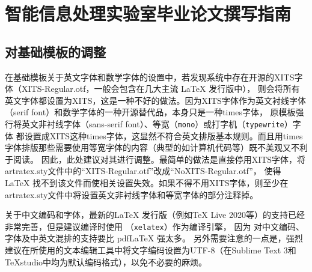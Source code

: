 
\newcommand*{\ltxcmdname}[1]{\texttt{\textbackslash #1}}
\newcommand*{\ltxenvname}[1]{\texttt{#1}}
\newcommand*{\dif}{\mathop{}\!\mathrm{d}}
\newcommand*{\tc}[1]{\multicolumn{1}{c|}{#1}} %

\newcommand*{\figref}[1]{图~\ref{#1}~}
\newcommand*{\secref}[1]{~\ref{#1}~节}
\newcommand*{\tabref}[1]{表~\ref{#1}~}
\newcommand*{\algoref}[1]{算法~\ref{#1}~}
\newcommand*{\codref}[1]{程序~\ref{#1}~}
\newcommand*{\thmref}[1]{定理~\ref{#1}~}
\newcommand*{\axmref}[1]{公理~\ref{#1}~}
\newcommand*{\lemref}[1]{引理~\ref{#1}~}
\newcommand*{\prpref}[1]{命题~\ref{#1}~}
\newcommand*{\defref}[1]{定义~\ref{#1}~}

\newcommand*{\ntcite}[1]{~\cite{#1}~}
\newcommand*{\npcite}[1]{\textsuperscript{\cite{#1}}}

\chapter{智能信息处理实验室毕业论文撰写指南}

\section{对基础模板的调整}

在基础模板关于英文字体和数学字体的设置中，若发现系统中存在开源的XITS字体（XITS-Regular.otf，一般会包含在几大主流 \LaTeX{} 发行版中），
则会将所有英文字体都设置为XITS，这是一种不好的做法。因为XITS字体作为英文衬线字体（serif font）和数学字体的一种开源替代品，本身只是一种times字体，
原模板强行将英文非衬线字体（\textsf{sans-serif font}）、等宽（\texttt{mono}）或打字机（\texttt{typewrite}）字体
都设置成XITS这种times字体，这显然不符合英文排版基本规则。而且用times字体排版那些需要使用等宽字体的内容（典型的如计算机代码等）既不美观又不利于阅读。
因此，此处建议对其进行调整。最简单的做法是直接停用XITS字体，将artratex.sty文件中的“XITS-Regular.otf”改成“NoXITS-Regular.otf”，
使得 \LaTeX{} 找不到该文件而使相关设置失效。如果不得不用XITS字体，则至少在artratex.sty文件中将设置英文非衬线字体和等宽字体的部分注释掉。

关于中文编码和字体，最新的\LaTeX{} 发行版（例如TeX Live 2020等）的支持已经非常完善，但是建议编译时使用 \XeLaTeX{} （\texttt{xelatex}）作为编译引擎，
因为 \XeLaTeX{} 对中文编码、字体及中英文混排的支持要比 pdfLaTeX 强太多。
另外需要注意的一点是，强烈建议在所使用的文本编辑工具中将文字编码设置为UTF-8（在Sublime Text 3和TeXstudio中均为默认编码格式），以免不必要的麻烦。

